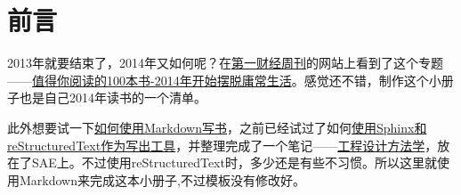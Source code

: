 \hypertarget{ux524dux8a00}{%
\section{前言}\label{ux524dux8a00}}

2013年就要结束了，2014年又如何呢？在\href{http://www.cbnweek.com/}{第一财经周刊}的网站上看到了这个专题------\href{http://www.cbnweek.com/v/subject?id=22}{值得你阅读的100本书-2014年开始摆脱庸常生活}。感觉还不错，制作这个小册子也是自己2014年读书的一个清单。

此外想要试一下\href{https://github.com/larrycai/kaiyuanbook/blob/master/zh/chapters/01-chapter3.markdown}{如何使用Markdown写书}，之前已经试过了如何\href{http://myshare.dscloud.me/scipydoc/pydoc_write_tools.html}{使用Sphinx和reStructuredText作为写出工具}，并整理完成了一个笔记------\href{http://conanxincv.sinaapp.com/project1/index.html}{工程设计方法学}，放在了SAE上。不过使用reStructuredText时，多少还是有些不习惯。所以这里就使用Markdown来完成这本小册子,不过模板没有修改好。
